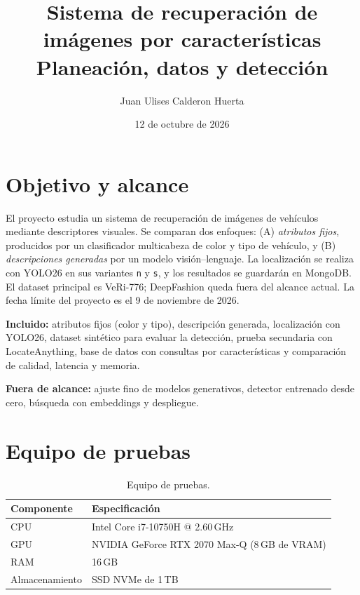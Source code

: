 \documentclass[11pt,a4paper]{article}
\title{Sistema de recuperaci\'on de im\'agenes por caracter\'isticas\\[0.3em]
\large Planeaci\'on, datos y detecci\'on}
\author{Juan Ulises Calderon Huerta}
\date{12 de octubre de 2026}
\begin{document}
\maketitle
\tableofcontents
\newpage

\section{Objetivo y alcance}

El proyecto estudia un sistema de recuperaci\'on de im\'agenes de veh\'iculos mediante
descriptores visuales. Se comparan dos enfoques: (A) \emph{atributos fijos}, producidos
por un clasificador multicabeza de color y tipo de veh\'iculo, y (B) \emph{descripciones
generadas} por un modelo visi\'on--lenguaje. La localizaci\'on se realiza con YOLO26 en sus
variantes \texttt{n} y \texttt{s}, y los resultados se guardar\'an en MongoDB. El dataset
principal es VeRi-776; DeepFashion queda fuera del alcance actual. La fecha l\'imite del
proyecto es el 9 de noviembre de 2026.

\textbf{Incluido:} atributos fijos (color y tipo), descripci\'on generada, localizaci\'on con
YOLO26, dataset sint\'etico para evaluar la detecci\'on, prueba secundaria con
LocateAnything, base de datos con consultas por caracter\'isticas y comparaci\'on de calidad,
latencia y memoria.

\textbf{Fuera de alcance:} ajuste fino de modelos generativos, detector entrenado desde cero,
b\'usqueda con embeddings y despliegue.

\section{Equipo de pruebas}

\begin{table}[ht]
\centering
\begin{tabular}{@{}ll@{}}
\toprule
Componente & Especificaci\'on \\
\midrule
CPU & Intel Core i7-10750H @ 2.60\,GHz \\
GPU & NVIDIA GeForce RTX 2070 Max-Q (8\,GB de VRAM) \\
RAM & 16\,GB \\
Almacenamiento & SSD NVMe de 1\,TB \\
\bottomrule
\end{tabular}
\caption{Equipo de pruebas.}
\end{table}
\end{document}
